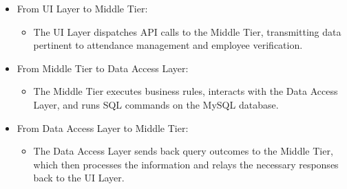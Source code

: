 \documentclass[a4paper, 12pt]{article}
\begin{document}
\begin{itemize}
    \item From UI Layer to Middle Tier:
    \begin{itemize}
        \item The UI Layer dispatches API calls to the Middle Tier, transmitting data pertinent to attendance management and employee verification.
    \end{itemize}
    \item From Middle Tier to Data Access Layer:
    \begin{itemize}
        \item The Middle Tier executes business rules, interacts with the Data Access Layer, and runs SQL commands on the MySQL database.
    \end{itemize}
    \item From Data Access Layer to Middle Tier:
    \begin{itemize}
        \item The Data Access Layer sends back query outcomes to the Middle Tier, which then processes the information and relays the necessary responses back to the UI Layer.
    \end{itemize}
\end{itemize}

\newpage
\end{document}
